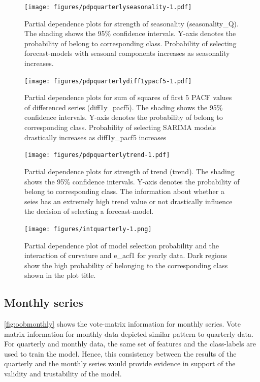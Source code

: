 \documentclass[11pt,a4paper,]{article}
\begin{document}
\begin{figure}
\centering
\texttt{[image: figures/pdpquarterlyseasonality-1.pdf]}
\caption{\label{fig:pdpquarterlyseasonality}Partial dependence plots for strength of seasonality (seasonality\_Q). The shading shows the 95\% confidence intervals. Y-axis denotes the probability of belong to corresponding class. Probability of selecting forecast-models with seasonal components increases as seasonality increases.}
\end{figure}

\begin{figure}
\centering
\texttt{[image: figures/pdpquarterlydiff1ypacf5-1.pdf]}
\caption{\label{fig:pdpquarterlydiff1ypacf5}Partial dependence plots for sum of squares of first 5 PACF values of differenced series (diff1y\_pacf5). The shading shows the 95\% confidence intervals. Y-axis denotes the probability of belong to corresponding class. Probability of selecting SARIMA models drastically increases as diff1y\_pacf5 increases}
\end{figure}

\begin{figure}
\centering
\texttt{[image: figures/pdpquarterlytrend-1.pdf]}
\caption{\label{fig:pdpquarterlytrend}Partial dependence plots for strength of trend (trend). The shading shows the 95\% confidence intervals. Y-axis denotes the probability of belong to corresponding class. The information about whether a seies has an extremely high trend value or not drastically influence the decision of selecting a forecast-model.}
\end{figure}

\begin{figure}
\centering
\texttt{[image: figures/intquarterly-1.png]}
\caption{\label{fig:intquarterly}Partial dependence plot of model selection probability and the interaction of curvature and e\_acf1 for yearly data. Dark regions show the high probability of belonging to the corresponding class shown in the plot title.}
\end{figure}

\hypertarget{monthly-series}{%
\subsection{Monthly series}\label{monthly-series}}

\autoref{fig:oobmonthly} shows the vote-matrix information for monthly series. Vote matrix information for monthly data depicted similar pattern to quarterly data. For quarterly and monthly data, the same set of features and the class-labels are used to train the model. Hence, this consistency between the results of the quarterly and the monthly series would provide evidence in support of the validity and trustability of the model.
\end{document}
